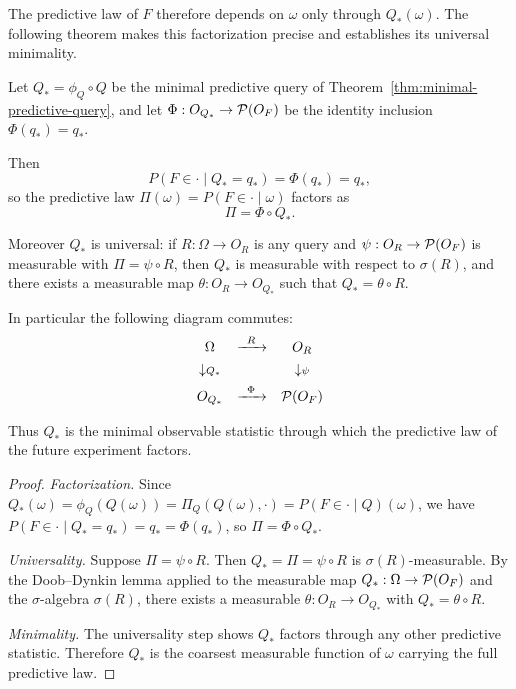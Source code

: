 The predictive law of $F$ therefore depends on $\omega$ only through
$Q_*(\omega)$.  The following theorem makes this factorization precise
and establishes its universal minimality.

\begin{theorem}\label{thm:predictive-factorization}
Let $Q_*=\phi_Q\circ Q$ be the minimal predictive query of
Theorem~\ref{thm:minimal-predictive-query}, and let
$\Phi:O_{Q_*}\to\mathcal{P}(O_F)$ be the identity inclusion
$\Phi(q_*)=q_*$.

Then
\[
P(F\in\cdot\mid Q_*=q_*)=\Phi(q_*)=q_*,
\]
so the predictive law $\Pi(\omega)=P(F\in\cdot\mid\omega)$ factors as
\[
\Pi = \Phi\circ Q_*.
\]

Moreover $Q_*$ is universal: if $R:\Omega\to O_R$ is any query and
$\psi:O_R\to\mathcal{P}(O_F)$ is measurable with $\Pi=\psi\circ R$, then
$Q_*$ is measurable with respect to $\sigma(R)$, and there exists a
measurable map $\theta:O_R\to O_{Q_*}$ such that $Q_*=\theta\circ R$.

In particular the following diagram commutes:
\[
\begin{array}{ccc}
\Omega & \xrightarrow{\;\;R\;\;} & O_R \\[4pt]
\downarrow\scriptstyle{Q_*} & & \downarrow\scriptstyle{\psi} \\[4pt]
O_{Q_*} & \xrightarrow{\;\;\Phi\;\;} & \mathcal{P}(O_F)
\end{array}
\]

Thus $Q_*$ is the minimal observable statistic through which the
predictive law of the future experiment factors.
\end{theorem}

\begin{proof}
\textit{Factorization.}
Since $Q_*(\omega)=\phi_Q(Q(\omega))=\Pi_Q(Q(\omega),\cdot)
=P(F\in\cdot\mid Q)(\omega)$, we have
$P(F\in\cdot\mid Q_*=q_*)=q_*=\Phi(q_*)$,
so $\Pi=\Phi\circ Q_*$.

\textit{Universality.}
Suppose $\Pi=\psi\circ R$.  Then $Q_*=\Pi=\psi\circ R$ is
$\sigma(R)$-measurable.  By the Doob--Dynkin lemma applied to the
measurable map $Q_*:\Omega\to\mathcal{P}(O_F)$ and the $\sigma$-algebra
$\sigma(R)$, there exists a measurable $\theta:O_R\to O_{Q_*}$ with
$Q_*=\theta\circ R$.

\textit{Minimality.}
The universality step shows $Q_*$ factors through any other predictive
statistic.  Therefore $Q_*$ is the coarsest measurable function of
$\omega$ carrying the full predictive law.
\end{proof}

